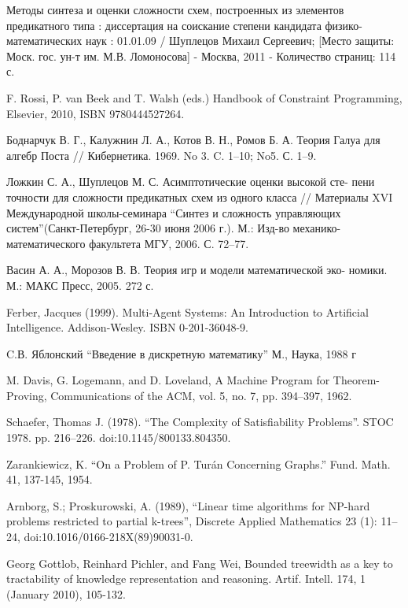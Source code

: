 \documentclass[12pt]{extarticle}
\begin{document}
Методы синтеза и оценки сложности схем, построенных из элементов предикатного типа : 
диссертация на соискание степени кандидата физико-математических наук : 01.01.09 / Шуплецов Михаил Сергеевич; 
[Место защиты: Моск. гос. ун-т им. М.В. Ломоносова] - Москва, 2011 - Количество страниц: 114 с.

 F. Rossi, P. van Beek and T. Walsh (eds.) Handbook of Constraint Programming, Elsevier, 2010, ISBN 9780444527264.

Боднарчук В. Г., Калужнин Л. А., Котов В. Н., Ромов Б. А. Теория
Галуа для алгебр Поста // Кибернетика. 1969. No 3. C. 1–10; No5. С. 1–9.

Ложкин С. А., Шуплецов М. С. Асимптотические оценки высокой сте-
пени точности для сложности предикатных схем из одного класса //
Материалы XVI Международной школы-семинара 
``Синтез и сложность управляющих систем''(Санкт-Петербург, 26-30 июня 2006 г.). М.:
Изд-во механико-математического факультета МГУ, 2006. С. 72–77.


Васин А. А., Морозов В. В. Теория игр и модели математической эко-
номики. М.: МАКС Пресс, 2005. 272 с.

Ferber, Jacques (1999). Multi-Agent Systems: An Introduction to Artificial Intelligence. Addison-Wesley.
ISBN 0-201-36048-9.

C.В. Яблонский ``Введение в дискретную математику'' М., Наука, 1988 г

M. Davis, G. Logemann, and D. Loveland, A Machine Program for Theorem-Proving,
Communications of the ACM, vol. 5, no. 7, pp. 394–397, 1962.

 Schaefer, Thomas J. (1978). 
``The Complexity of Satisfiability Problems''. STOC 1978. pp. 216–226. doi:10.1145/800133.804350.

 Zarankiewicz, K. ``On a Problem of P. Turán Concerning Graphs.'' Fund. Math. 41, 137-145, 1954. 

 Arnborg, S.; Proskurowski, A. (1989), 
``Linear time algorithms for NP-hard problems restricted to partial k-trees'',
Discrete Applied Mathematics 23 (1): 11–24, doi:10.1016/0166-218X(89)90031-0.

Georg Gottlob, Reinhard Pichler, and Fang Wei, 
Bounded treewidth as a key to tractability of knowledge representation and reasoning. 
Artif. Intell. 174, 1 (January 2010), 105-132. 
\end{document}
